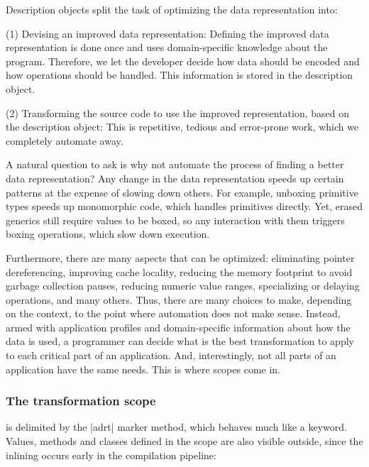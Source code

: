 Description objects split the task of optimizing the data representation into:

\vspace{0.35em}
\begin{compactitem}
\item[(1)] Devising an improved data representation: Defining the improved data representation is done once and uses domain-specific knowledge about the program. Therefore, we let the developer decide how data should be encoded and how operations should be handled. This information is stored in the description object.
\item[(2)] Transforming the source code to use the improved representation, based on the description object: This is repetitive, tedious and error-prone work, which we completely automate away.
\end{compactitem}
\vspace{0.35em}

A natural question to ask is why not automate the process of finding a better data representation? Any change in the data representation speeds up certain patterns at the expense of slowing down others. For example, unboxing primitive types speeds up monomorphic code, which handles primitives directly. Yet, erased generics still require values to be boxed, so any interaction with them triggers boxing operations, which slow down execution.

Furthermore, there are many aspects that can be optimized: eliminating pointer dereferencing, improving cache locality, reducing the memory footprint to avoid garbage collection pauses, reducing numeric value ranges, specializing or delaying operations, and many others. Thus, there are many choices to make, depending on the context, to the point where automation does not make sense. Instead, armed with application profiles and domain-specific information about how the data is used, a programmer can decide what is the best transformation to apply to each critical part of an application. And, interestingly, not all parts of an application have the same needs. This is where scopes come in.

\vspace{-0.2em}

\subsubsection{The transformation scope} is delimited by the |adrt| marker method, which behaves much like a keyword. Values, methods and classes defined in the scope are also visible outside, since the inlining occurs early in the compilation pipeline:

